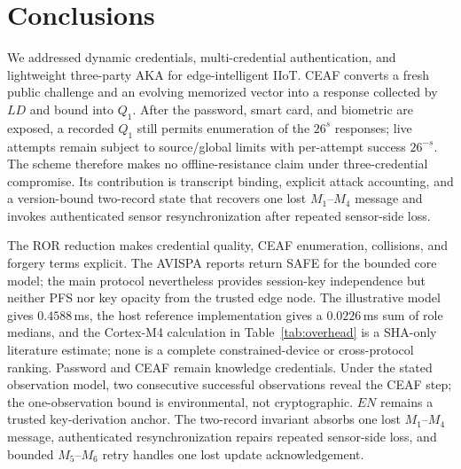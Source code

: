 \documentclass[cmc,article,submit,moreauthors,pdftex]{Definitions/tsp}
\begin{document}
\section{Conclusions}\label{sec:conclusions}

We addressed dynamic credentials, multi-credential authentication, and lightweight three-party AKA for edge-intelligent IIoT. CEAF converts a fresh public challenge and an evolving memorized vector into a response collected by $LD$ and bound into $Q_1$. After the password, smart card, and biometric are exposed, a recorded $Q_1$ still permits enumeration of the $26^s$ responses; live attempts remain subject to source/global limits with per-attempt success $26^{-s}$. The scheme therefore makes no offline-resistance claim under three-credential compromise. Its contribution is transcript binding, explicit attack accounting, and a version-bound two-record state that recovers one lost $M_1$--$M_4$ message and invokes authenticated sensor resynchronization after repeated sensor-side loss.

The ROR reduction makes credential quality, CEAF enumeration, collisions, and forgery terms explicit. The AVISPA reports return SAFE for the bounded core model; the main protocol nevertheless provides session-key independence but neither PFS nor key opacity from the trusted edge node. The illustrative model gives $0.4588$\,ms, the host reference implementation gives a $0.0226$\,ms sum of role medians, and the Cortex-M4 calculation in Table~\ref{tab:overhead} is a SHA-only literature estimate; none is a complete constrained-device or cross-protocol ranking. Password and CEAF remain knowledge credentials. Under the stated observation model, two consecutive successful observations reveal the CEAF step; the one-observation bound is environmental, not cryptographic. $EN$ remains a trusted key-derivation anchor. The two-record invariant absorbs one lost $M_1$--$M_4$ message, authenticated resynchronization repairs repeated sensor-side loss, and bounded $M_5$--$M_6$ retry handles one lost update acknowledgement.
\end{document}
